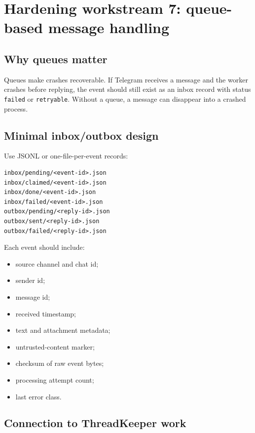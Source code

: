 \documentclass[11pt]{article}
\begin{document}
\section{Hardening workstream 7: queue-based message handling}

\subsection{Why queues matter}

Queues make crashes recoverable. If Telegram receives a message and the worker crashes before replying, the event should still exist as an inbox record with status \texttt{failed} or \texttt{retryable}. Without a queue, a message can disappear into a crashed process.

\subsection{Minimal inbox/outbox design}

Use JSONL or one-file-per-event records:

\begin{Verbatim}[fontsize=\small]
inbox/pending/<event-id>.json
inbox/claimed/<event-id>.json
inbox/done/<event-id>.json
inbox/failed/<event-id>.json
outbox/pending/<reply-id>.json
outbox/sent/<reply-id>.json
outbox/failed/<reply-id>.json
\end{Verbatim}

Each event should include:

\begin{itemize}
  \item source channel and chat id;
  \item sender id;
  \item message id;
  \item received timestamp;
  \item text and attachment metadata;
  \item untrusted-content marker;
  \item checksum of raw event bytes;
  \item processing attempt count;
  \item last error class.
\end{itemize}

\subsection{Connection to ThreadKeeper work}
\end{document}
